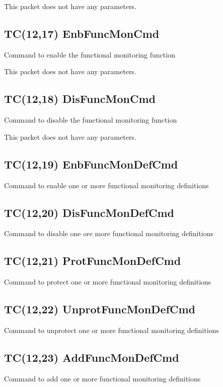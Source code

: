 This packet does not have any parameters.

\pagebreak
\subsection{TC(12,17) EnbFuncMonCmd}
Command to enable the functional monitoring function

This packet does not have any parameters.

\pagebreak
\subsection{TC(12,18) DisFuncMonCmd}
Command to disable the functional monitoring function

This packet does not have any parameters.

\pagebreak
\subsection{TC(12,19) EnbFuncMonDefCmd}
Command to enable one or more functional monitoring definitions

\pagebreak
\subsection{TC(12,20) DisFuncMonDefCmd}
Command to disable one ore more functional monitoring definitions

\pagebreak
\subsection{TC(12,21) ProtFuncMonDefCmd}
Command to protect one or more functional monitoring definitions

\pagebreak
\subsection{TC(12,22) UnprotFuncMonDefCmd}
Command to unprotect one or more functional monitoring definitions

\pagebreak
\subsection{TC(12,23) AddFuncMonDefCmd}
Command to add one or more functional monitoring definitions

